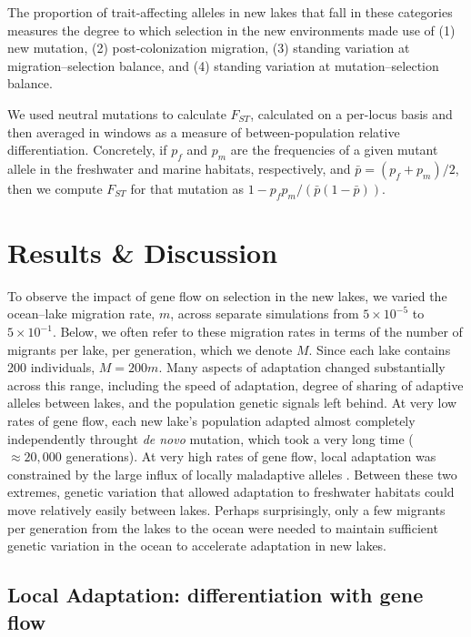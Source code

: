\documentclass{article}
\begin{document}
The proportion of trait-affecting alleles in new lakes that fall in these categories measures the degree to which selection in the new environments made use of
(1) new mutation, 
(2) post-colonization migration, 
(3) standing variation at migration--selection balance, and
(4) standing variation at mutation--selection balance.

We used neutral mutations to calculate $F_{ST}$, calculated on a per-locus basis and then averaged in windows as a measure of between-population relative differentiation. Concretely, if $p_f$ and $p_m$ are the frequencies of a given mutant allele in the freshwater and marine habitats, respectively, and $\bar p = (p_f + p_m)/2$, then we compute $F_{ST}$ for that mutation as $1 - p_f p_m / (\bar p (1-\bar p))$.

\section*{Results \& Discussion}

To observe the impact of gene flow on selection in the new lakes, we varied the ocean--lake migration rate, $m$, across separate simulations from $5 \times 10^{-5}$ to $5 \times 10^{-1}$. Below, we often refer to these migration rates in terms of the number of migrants per lake, per generation, which we denote $M$. Since each lake contains 200 individuals, $M=200m$. Many aspects of adaptation changed substantially across this range, including the speed of adaptation, degree of sharing of adaptive alleles between lakes, and the population genetic signals left behind. At very low rates of gene flow, each new lake's population adapted almost completely independently throught \emph{de novo} mutation, which took a very long time ($\approx 20,000$ generations). At very high rates of gene flow, local adaptation was constrained by the large influx of locally maladaptive alleles \citet{bolnick2007natural}. Between these two extremes, genetic variation that allowed adaptation to freshwater habitats could move relatively easily between lakes. Perhaps surprisingly, only a few migrants per generation from the lakes to the ocean were needed to maintain sufficient genetic variation in the ocean to accelerate adaptation in new lakes.

\subsection*{Local Adaptation: differentiation with gene flow}
\end{document}
